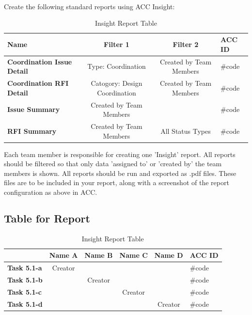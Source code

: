 Create the following standard reports using ACC Insight: 

\begin{table}[ht]
	\centering
	\begin{tabular}{|l|c|c|l|}
		\hline
		\textbf{Name} & \textbf{Filter 1} & \textbf{Filter 2} & \textbf{ACC ID}\\
		\hline
		\textbf{Coordination Issue Detail} & Type: Coordination & Created by Team Members & \#code\\
		\textbf{Coordination RFI Detail} & Catogory: Design Coordination & Created by Team Members & \#code\\
		\textbf{Issue Summary} & Created by Team Members &  & \#code\\
		\textbf{RFI Summary} & Created by Team Members & All Status Types & \#code\\
		\hline
	\end{tabular}
	\caption{Insight Report Table }
	\label{tab:insight-items}
\end{table}


Each team member is responsible for creating one 'Insight' report.  All reports should be filtered so that only data 'assigned to' or 'created by' the team members is shown.  All reports should be run and exported as .pdf files.  These files are to be included in your report, along with a screenshot of the report configuration as above in ACC.\\

\subsection{Table for Report}

\begin{table}[ht]
	\centering
	\begin{tabular}{|l|c|c|c|c|l|}
		\hline
		& \textbf{Name A} & \textbf{Name B} & \textbf{Name C} & \textbf{Name D} & \textbf{ACC ID}\\
		\hline
		\textbf{Task 5.1-a} &  Creator &  &  &  & \#code\\
		\textbf{Task 5.1-b} &  & Creator &  &  & \#code\\
		\textbf{Task 5.1-c} &  &  & Creator &  & \#code\\
		\textbf{Task 5.1-d} &  &  &  & Creator & \#code\\
		\hline
	\end{tabular}
	\caption{Insight Report Table }
	\label{tab:insight-items}
\end{table}



